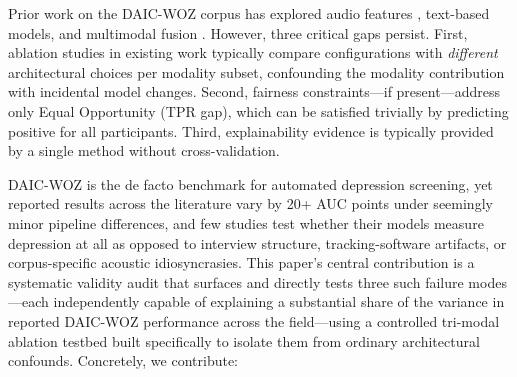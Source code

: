\documentclass[journal]{IEEEtran}
\begin{document}
Prior work on the DAIC-WOZ corpus \cite{gratch2014} has explored
audio features \cite{ringeval2017}, text-based models, and multimodal
fusion \cite{gong2017,williamson2016}. However, three critical gaps
persist. First, ablation studies in existing work typically compare
configurations with \emph{different} architectural choices per modality
subset, confounding the modality contribution with incidental model
changes. Second, fairness constraints---if present---address only
Equal Opportunity (TPR gap), which can be satisfied trivially by
predicting positive for all participants. Third, explainability
evidence is typically provided by a single method without
cross-validation.

DAIC-WOZ is the de facto benchmark for automated depression screening,
yet reported results across the literature vary by 20+ AUC points
under seemingly minor pipeline differences, and few studies test
whether their models measure depression at all as opposed to
interview structure, tracking-software artifacts, or corpus-specific
acoustic idiosyncrasies. This paper's central contribution is a
systematic validity audit that surfaces and directly tests three
such failure modes---each independently capable of explaining a
substantial share of the variance in reported DAIC-WOZ performance
across the field---using a controlled tri-modal ablation testbed
built specifically to isolate them from ordinary architectural
confounds. Concretely, we contribute:
\end{document}
